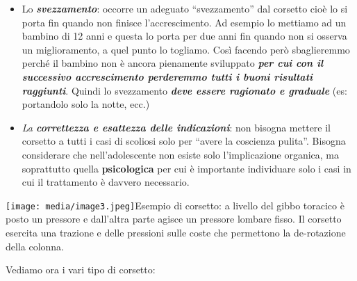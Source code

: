 \documentclass[]{article}
\begin{document}
\begin{itemize}
\item
  Lo \textbf{\emph{svezzamento}}: occorre un adeguato ``svezzamento''
  dal corsetto cioè lo si porta fin quando non finisce l'accrescimento.
  Ad esempio lo mettiamo ad un bambino di 12 anni e questa lo porta per
  due anni fin quando non si osserva un miglioramento, a quel punto lo
  togliamo. Così facendo però sbaglieremmo perché il bambino non è
  ancora pienamente sviluppato \textbf{\emph{per cui con il successivo
  accrescimento perderemmo tutti i buoni risultati raggiunti}}. Quindi
  lo svezzamento \textbf{\emph{deve essere ragionato e graduale}} (es:
  portandolo solo la notte, ecc.)
\item
  \emph{La \textbf{correttezza e esattezza delle indicazioni}}: non
  bisogna mettere il corsetto a tutti i casi di scoliosi solo per
  ``avere la coscienza pulita''. Bisogna considerare che
  nell'adolescente non esiste solo l'implicazione organica, ma
  soprattutto quella \textbf{psicologica} per cui è importante
  individuare solo i casi in cui il trattamento è davvero necessario.
\end{itemize}

\texttt{[image: media/image3.jpeg]}Esempio
di corsetto: a livello del gibbo toracico è posto un pressore e
dall'altra parte agisce un pressore lombare fisso. Il corsetto esercita
una trazione e delle pressioni sulle coste che permettono la
de-rotazione della colonna.

Vediamo ora i vari tipo di corsetto:
\end{document}

